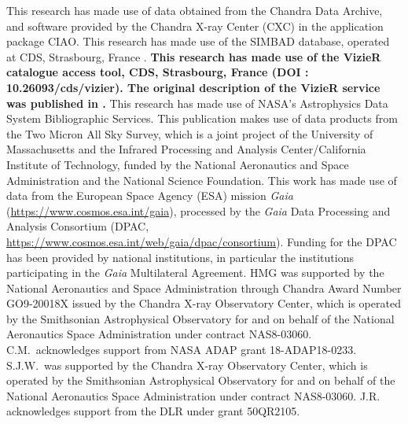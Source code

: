 \documentclass[linenumbers]{aastex631}
\begin{document}
\begin{acknowledgements}

This research has made use of data obtained from the Chandra Data Archive, and software provided by the Chandra X-ray Center (CXC) in the application package CIAO.
This research has made use of the SIMBAD database,
operated at CDS, Strasbourg, France \citep{2000A&AS..143....9W}. 
\textbf{This research has made use of the VizieR catalogue access tool, CDS,
 Strasbourg, France (DOI : 10.26093/cds/vizier). The original description 
 of the VizieR service was published in \citet{2000A&AS..143...23O}.}
This research has made use of NASA’s Astrophysics Data System Bibliographic Services.
This publication makes use of data products from the Two Micron All Sky Survey, which is a joint project of the University of Massachusetts and the Infrared Processing and Analysis Center/California Institute of Technology, funded by the National Aeronautics and Space Administration and the National Science Foundation.
This work has made use of data from the European Space Agency (ESA) mission
{\it Gaia} (\url{https://www.cosmos.esa.int/gaia}), processed by the {\it Gaia}
Data Processing and Analysis Consortium (DPAC,
\url{https://www.cosmos.esa.int/web/gaia/dpac/consortium}). Funding for the DPAC
has been provided by national institutions, in particular the institutions
participating in the {\it Gaia} Multilateral Agreement.
HMG was supported by the National Aeronautics and Space Administration through Chandra Award Number GO9-20018X issued by the Chandra X-ray Observatory Center, which is operated by the Smithsonian Astrophysical Observatory for and on behalf of the National Aeronautics Space Administration under contract NAS8-03060. C.M.\ acknowledges support from NASA ADAP grant 18-ADAP18-0233. S.J.W.\ was supported by the Chandra X-ray Observatory Center, which is operated by the Smithsonian Astrophysical Observatory for and on behalf of the National Aeronautics Space Administration under contract NAS8-03060. J.R. acknowledges support from the DLR under grant 50QR2105.

\end{acknowledgements}



{}



\end{document}
